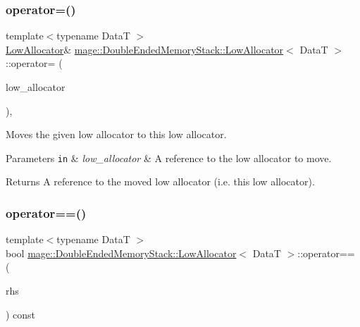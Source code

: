 \subsubsection{\texorpdfstring{operator=()}{operator=()}\hspace{0.1cm}{\footnotesize\ttfamily [2/2]}}
{\footnotesize\ttfamily template$<$typename DataT $>$ \\
\hyperlink{structmage_1_1_double_ended_memory_stack_1_1_low_allocator}{Low\+Allocator}\& \hyperlink{structmage_1_1_double_ended_memory_stack_1_1_low_allocator}{mage\+::\+Double\+Ended\+Memory\+Stack\+::\+Low\+Allocator}$<$ DataT $>$\+::operator= (\begin{DoxyParamCaption}\item[{\hyperlink{structmage_1_1_double_ended_memory_stack_1_1_low_allocator}{Low\+Allocator}$<$ DataT $>$ \&\&}]{low\+\_\+allocator }\end{DoxyParamCaption})\hspace{0.3cm}{\ttfamily [delete]}, {\ttfamily [noexcept]}}

Moves the given low allocator to this low allocator.


\begin{DoxyParams}[1]{Parameters}
\mbox{\tt in}  & {\em low\+\_\+allocator} & A reference to the low allocator to move. \\
\hline
\end{DoxyParams}
\begin{DoxyReturn}{Returns}
A reference to the moved low allocator (i.\+e. this low allocator). 
\end{DoxyReturn}
\hypertarget{structmage_1_1_double_ended_memory_stack_1_1_low_allocator_abffbd099f822e3c83daa438416dbbb7b}{}\label{structmage_1_1_double_ended_memory_stack_1_1_low_allocator_abffbd099f822e3c83daa438416dbbb7b} 
\subsubsection{\texorpdfstring{operator==()}{operator==()}}
{\footnotesize\ttfamily template$<$typename DataT $>$ \\
bool \hyperlink{structmage_1_1_double_ended_memory_stack_1_1_low_allocator}{mage\+::\+Double\+Ended\+Memory\+Stack\+::\+Low\+Allocator}$<$ DataT $>$\+::operator== (\begin{DoxyParamCaption}\item[{const \hyperlink{structmage_1_1_double_ended_memory_stack_1_1_low_allocator}{Low\+Allocator}$<$ DataT $>$ \&}]{rhs }\end{DoxyParamCaption}) const\hspace{0.3cm}{\ttfamily [noexcept]}}

